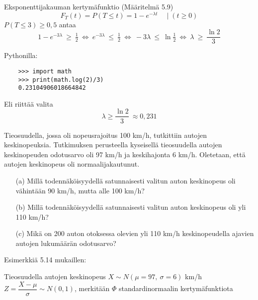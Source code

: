 \documentclass[12pt,a4paper]{article}
\begin{document}
Eksponenttijakauman kertymäfunktio (Määritelmä 5.9)
\[
F_T(t)=P(T\le t)=1-e^{-\lambda t}\quad \mid(t\ge 0)
\]
$P(T\le 3)\ge 0{,}5$ antaa
\[
1-e^{-3\lambda}\ \ge\ \tfrac12
\ \Longleftrightarrow\
e^{-3\lambda}\ \le\ \tfrac12
\ \Longleftrightarrow\
-3\lambda\ \le\ \ln\tfrac12
\ \Longleftrightarrow\
\lambda\ \ge\ \frac{\ln 2}{3}
\]

Pythonilla:
\begin{verbatim}
    >>> import math
    >>> print(math.log(2)/3)
    0.23104906018664842
\end{verbatim}

Eli riittää valita 
\[
\lambda \ge \dfrac{\ln 2}{3}\ \approx 0{,}231
\]







\pagebreak
{}
Tieosuudella, jossa oli nopeusrajoitus 100 km/h, tutkittiin autojen keskinopeuksia. Tutkimuksen perusteella kyseisellä tieosuudella autojen keskinopeuden odotusarvo oli 97 km/h ja keskihajonta 6 km/h. Oletetaan, että autojen keskinopeus oli normaalijakautunut.
\begin{enumerate}
\item[(a)] Millä todennäköisyydellä satunnaisesti valitun auton keskinopeus oli vähintään 90 km/h, mutta alle 100 km/h?
\item[(b)] Millä todennäköisyydellä satunnaisesti valitun auton keskinopeus oli yli 110 km/h?
\item[(c)] Mikä on 200 auton otoksessa olevien yli 110 km/h keskinopeudella ajavien autojen lukumäärän odotusarvo?
\end{enumerate}
\vspace{0.8cm}


Esimerkkiä 5.14 mukaillen:
\vspace{0.2cm}

Tieosuudella autojen keskinopeus 
$X\sim N(\mu=97,\ \sigma=6)$ km/h\\

$Z=\dfrac{X-\mu}{\sigma}\sim N(0,1)$, merkitään $\Phi$ standardinormaalin kertymäfunktiota
\end{document}
